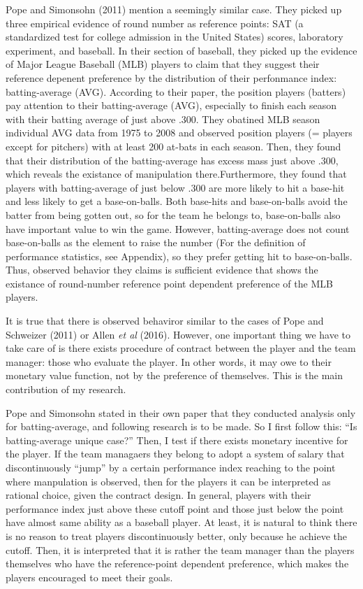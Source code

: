 \documentclass[dvipdfmx, 12pt]{article}
\begin{document}
  Pope and Simonsohn (2011) mention a seemingly similar case. They picked up three empirical evidence of round number as reference points: SAT (a standardized test for college admission in the United States) scores, laboratory experiment, and baseball. In their section of baseball, they picked up the evidence of Major League Baseball (MLB) players to claim that they suggest their reference depenent preference by the distribution of their perfonmance index: batting-average (AVG). According to their paper, the position players (batters) pay attention to their batting-average (AVG), especially to finish each season with their batting average of just above .300. They obatined MLB season individual AVG data from 1975 to 2008 and observed position players (= players except for pitchers) with at least 200 at-bats in each season. Then, they found that their distribution of the batting-average has excess mass just above .300, which reveals the existance of manipulation there.Furthermore, they found that players with batting-average of just below .300 are more likely to hit a base-hit and less likely to get a base-on-balls. Both base-hits and base-on-balls avoid the batter from being gotten out, so for the team he belongs to, base-on-balls also have important value to win the game. However, batting-average does not count base-on-balls as the element to raise the number (For the definition of performance statistics, see Appendix), so they prefer getting hit to base-on-balls. Thus, observed behavior they claims is sufficient evidence that shows the existance of round-number reference point dependent preference of the MLB players.

  It is true that there is observed behaviror similar to the cases of Pope and Schweizer (2011) or Allen \textit{et al} (2016). However, one important thing we have to take care of is there exists procedure of contract between the player and the team manager: those who evaluate the player. In other words, it may owe to their monetary value function, not by the preference of themselves. This is the main contribution of my research.

  Pope and Simonsohn stated in their own paper that they conducted analysis only for batting-average, and following research is to be made. So I first follow this: ``Is batting-average unique case?'' Then, I test if there exists monetary incentive for the player. If the team managaers they belong to adopt a system of salary that discontinuously ``jump'' by a certain performance index reaching to the point where manpulation is observed, then for the players it can be interpreted as rational choice, given the contract design. In general, players with their performance index just above these cutoff point and those just below the point have almost same ability as a baseball player. At least, it is natural to think there is no reason to treat players discontinuously better, only because he achieve the cutoff. Then, it is interpreted that it is rather the team manager than the players themselves who have the reference-point dependent preference, which makes the players encouraged to meet their goals.
\end{document}
